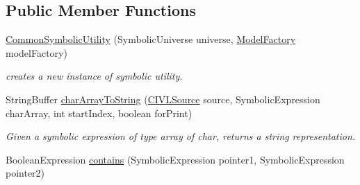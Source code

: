 \subsection*{Public Member Functions}
\begin{DoxyCompactItemize}
\item 
\hyperlink{classedu_1_1udel_1_1cis_1_1vsl_1_1civl_1_1dynamic_1_1common_1_1CommonSymbolicUtility_aa3e56ac40c99de0e9a24570fc4405e90}{Common\+Symbolic\+Utility} (Symbolic\+Universe universe, \hyperlink{interfaceedu_1_1udel_1_1cis_1_1vsl_1_1civl_1_1model_1_1IF_1_1ModelFactory}{Model\+Factory} model\+Factory)
\begin{DoxyCompactList}\small\item\em creates a new instance of symbolic utility. \end{DoxyCompactList}\item 
String\+Buffer \hyperlink{classedu_1_1udel_1_1cis_1_1vsl_1_1civl_1_1dynamic_1_1common_1_1CommonSymbolicUtility_ad64faeec6c1e384e1a4f53f635b805da}{char\+Array\+To\+String} (\hyperlink{interfaceedu_1_1udel_1_1cis_1_1vsl_1_1civl_1_1model_1_1IF_1_1CIVLSource}{C\+I\+V\+L\+Source} source, Symbolic\+Expression char\+Array, int start\+Index, boolean for\+Print)
\begin{DoxyCompactList}\small\item\em Given a symbolic expression of type array of char, returns a string representation. \end{DoxyCompactList}\item 
\hypertarget{classedu_1_1udel_1_1cis_1_1vsl_1_1civl_1_1dynamic_1_1common_1_1CommonSymbolicUtility_a733b13042420ddf3c5bb74935fdfa730}{}Boolean\+Expression \hyperlink{classedu_1_1udel_1_1cis_1_1vsl_1_1civl_1_1dynamic_1_1common_1_1CommonSymbolicUtility_a733b13042420ddf3c5bb74935fdfa730}{contains} (Symbolic\+Expression pointer1, Symbolic\+Expression pointer2)\label{classedu_1_1udel_1_1cis_1_1vsl_1_1civl_1_1dynamic_1_1common_1_1CommonSymbolicUtility_a733b13042420ddf3c5bb74935fdfa730}


\end{DoxyCompactItemize}
